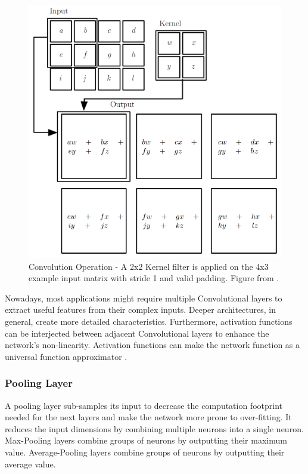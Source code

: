 \begin{figure} [H]
	\centering
	\includegraphics[scale=0.6]{../Images/CNNArchitectures/convolution-operation.png}
	\decoRule
	\caption[Convolution Operation]{Convolution Operation - A 2x2 Kernel filter is applied on the 4x3 example input matrix with stride 1 and valid padding. Figure from \cite{Goodfellow-et-al-2016}.}
	\label{fig:convolution-operation}
\end{figure}

Nowadays, most applications might require multiple Convolutional layers to extract useful features from their complex inputs. Deeper architectures, in general, create more detailed characteristics. Furthermore, activation functions can be interjected between adjacent Convolutional layers to enhance the network's non-linearity. Activation functions can make the network function as a universal function approximator \cite{Approximation-capabilities-of-multilayer-feedforward-networks}.

\subsubsection{Pooling Layer}
A pooling layer sub-samples its input to decrease the computation footprint needed for the next layers and make the network more prone to over-fitting. It reduces the input dimensions by combining multiple neurons into a single neuron. Max-Pooling layers combine groups of neurons by outputting their maximum value. Average-Pooling layers combine groups of neurons by outputting their average value.

